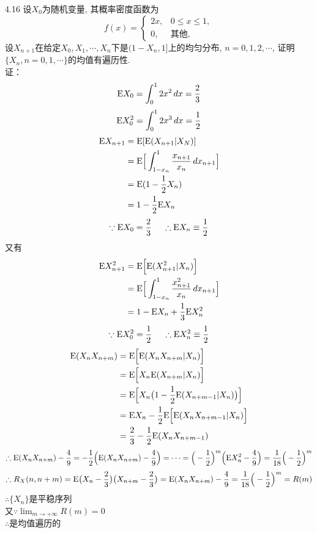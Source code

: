 4.16 设$X_0$为随机变量, 其概率密度函数为
\[
f(x) =
\begin{cases}
2x,& 0 \leqslant x \leqslant 1,\\
0,& \text{其他},
\end{cases}
\]
设$X_{n+1}$在给定$X_0, X_1, \cdots, X_n$下是$(1-X_n,1]$上的均匀分布, $n=0,1,2,\cdots$, 证明$\{X_n, n=0,1,\cdots\}$的均值有遍历性.\\
证：
\[
\mathrm{E} X_0 = \int^1_02x^2\,dx = \frac{2}{3}
\]
\[
\mathrm{E} X^2_0 = \int^1_02x^3\,dx = \frac{1}{2}
\]
\[
\begin{split}
\mathrm{E} X_{n+1} & = \mathrm{E}[\mathrm{E}(X_{n+1}|X_N)]\\
			& = \mathrm{E}\Big[\int^1_{1-x_n}\frac{x_{n+1}}{x_n}\,dx_{n+1}\Big]\\
			& = \mathrm{E}(1-\frac{1}{2}X_n)\\
			& = 1-\frac{1}{2}\mathrm{E} X_n\\
\end{split}
\]
\[
\because \mathrm{E} X_0 = \frac{2}{3} ~~~~\therefore \mathrm{E} X_n \equiv \frac{1}{2}
\]
又有
\[
\begin{split}
\mathrm{E} X^2_{n+1} & = \mathrm{E}\Big[\mathrm{E}(X^2_{n+1}|X_n)\Big]\\
			& = \mathrm{E} \Big[\int^1_{1-x_n}\frac{x^2_{n+1}}{x_n}\,dx_{n+1}\Big]\\
			& = 1 - \mathrm{E} X_n + \frac{1}{3}\mathrm{E} X^2_n
\end{split}
\]
\[
\because \mathrm{E} X^2_0 = \frac{1}{2}~~~~\therefore \mathrm{E} X^2_n \equiv \frac{1}{2}
\]
\[
\begin{split}
\mathrm{E}(X_nX_{n+m}) & = \mathrm{E}\Big[\mathrm{E}(X_nX_{n+m}|X_n)\Big]\\
			& = \mathrm{E}\Big[X_n\mathrm{E}(X_{n+m}|X_n)\Big]\\
			& = \mathrm{E}\Big[X_n\big(1-\frac{1}{2}\mathrm{E}(X_{n+m-1}|X_n)\big)\Big]\\
			& = \mathrm{E} X_n - \frac{1}{2}\mathrm{E}\Big[\mathrm{E}(X_nX_{n+m-1}|X_n)\Big]\\
			& = \frac{2}{3} - \frac{1}{2}\mathrm{E}(X_nX_{n+m-1})\\
\end{split}
\]
\[
\begin{split}
\therefore \mathrm{E} (X_nX_{n+m}) - \frac{4}{9} = - \frac{1}{2}\Big(\mathrm{E}(X_nX_{n+m}) -  \frac{4}{9}\Big) = \cdots = \Big(-\frac{1}{2}\Big)^m\Big(\mathrm{E} X^2_n - \frac{4}{9}\Big) = \frac{1}{18}\Big(-\frac{1}{2}\Big)^m
\end{split}
\]
\[
\therefore R_X(n,n+m) = \mathrm{E}\big(X_n - \frac{2}{3}\big)\big(X_{n+m} - \frac{2}{3}\big) = \mathrm{E}(X_nX_{n+m}) - \frac{4}{9}= \frac{1}{18}\Big(-\frac{1}{2}\Big)^m = R(m)
\]
$\therefore \{X_n\}$是平稳序列\\
又$\because \lim_{m\rightarrow +\infty} R(m) = 0$\\
$\therefore$是均值遍历的\\


